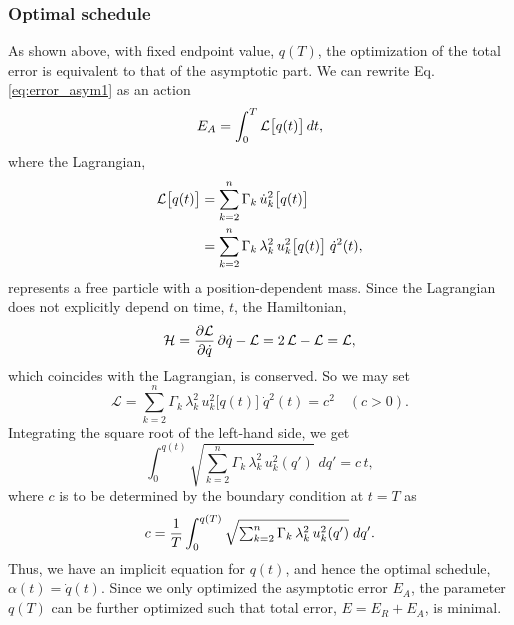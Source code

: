 \documentclass[reprint, floatfix]{revtex4-1}
\newcommand{\Err}{E}
\begin{document}
\subsubsection{\label{sec:optschedule}
Optimal schedule}


As shown above, with fixed endpoint value, $q(T)$,
the optimization of the total error is equivalent to
that of the asymptotic part.
%
We can rewrite Eq. \eqref{eq:error_asym1} as an action
%
\begin{equation}
  \Err_A
  =
  \int_0^T
    {\mathcal L} \bigl[ q(t)\bigr]
    \, dt,
  \notag
\end{equation}
%
where the Lagrangian,
%
\begin{align}
  {\mathcal L} \bigl[ q(t) \bigr]
  &=
  \sum_{ k = 2 }^n
    \Gamma_k \, \dot u_k^2\bigl[ q(t) \bigr]
  \notag
  \\
  &=
  \sum_{ k = 2 }^n
    \Gamma_k \, \lambda_k^2 \, u_k^2 \bigl[ q(t) \bigr]
  \; \dot q^2( t ),
  \label{eq:error_asym_Lagrangian}
\end{align}
%
represents a free particle
with a position-dependent mass.
%
Since the Lagrangian
does not explicitly depend on time, $t$,
the Hamiltonian,
%
\begin{equation}
  \mathcal H
  =
  \frac{ \partial \mathcal L }
       { \partial \dot q     }
  \, \partial \dot q
  -
  \mathcal L
  =
  2 \, \mathcal L
  - \mathcal L
  =
  \mathcal L,
  \notag
\end{equation}
%
which coincides with the Lagrangian,
is conserved.
%
So we may set
%
\begin{equation}
  \mathcal L
  =
    \textstyle\sum_{ k = 2 }^n
      \Gamma_k \, \lambda_k^2
      \, u_k^2 \bigl[ q(t) \bigr]
  \;
  \dot q^2(t)
  =
  c^2
  \quad
  (c > 0).
  \label{eq:Lagrangian_const}
\end{equation}
%
Integrating the square root of the left-hand side, we get
%
\begin{equation}
  \int_{ 0 }^{ q(t) }
    \sqrt{
      \textstyle\sum_{ k = 2 }^n
        \Gamma_k \, \lambda_k^2
        \, u_k^2( q' )
    }
    \;
    d q'
  =
  c \, t
  ,
  \label{eq:q_opt}
\end{equation}
%
where $c$ is to be determined by
the boundary condition at $t = T$ as
%
\begin{equation}
  c =
  \frac 1 T
  \int_{ 0 }^{ q(T) }
    \sqrt{
      \textstyle\sum_{ k = 2 }^n
        \Gamma_k \, \lambda_k^2
        \, u_k^2( q' )
    }
    \;
    d q'
  .
  \notag
\end{equation}
%
Thus, we have an implicit equation for $q(t)$,
and hence the optimal schedule,
$\alpha(t) = \dot q(t)$.
%
Since we only optimized the asymptotic error $E_A$,
the parameter $q(T)$ can be further optimized
such that total error, $E = E_R + E_A$, is minimal.
\end{document}
